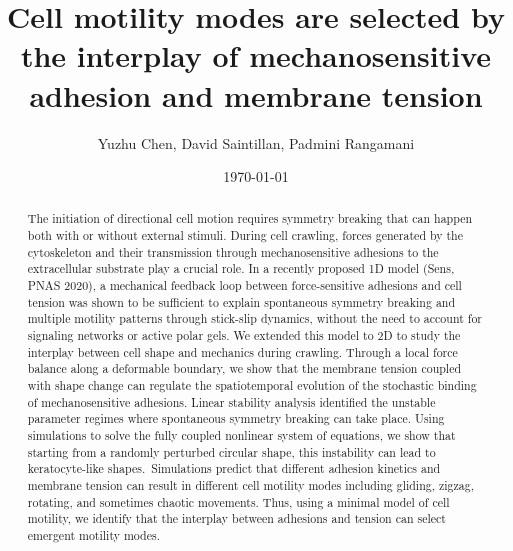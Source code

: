 \documentclass[12pt]{article}
\title{Cell motility modes are selected by the interplay of mechanosensitive adhesion and membrane tension}
\author{Yuzhu Chen, David Saintillan, Padmini Rangamani}
\date{\today}
\begin{document}
\maketitle

\begin{abstract}
    The initiation of directional cell motion requires symmetry breaking that can happen both with or without external stimuli. 
    During cell crawling, forces generated by the cytoskeleton and their transmission through mechanosensitive adhesions to the extracellular substrate play a crucial role. 
    In a recently proposed 1D model (Sens, PNAS 2020), a mechanical feedback loop between force-sensitive adhesions and cell tension was shown to be sufficient to explain spontaneous symmetry breaking and multiple motility patterns through stick-slip dynamics, without the need to account for signaling networks or active polar gels. 
    We extended this model to 2D to study the interplay between cell shape and mechanics during crawling. 
    Through a local force balance along a deformable boundary, we show that the membrane tension coupled with shape change can regulate the spatiotemporal evolution of the stochastic binding of mechanosensitive adhesions. 
    Linear stability analysis identified the unstable parameter regimes where spontaneous symmetry breaking can take place. 
    Using simulations to solve the fully coupled nonlinear system of equations, we show that starting from a randomly perturbed circular shape, this instability can lead to keratocyte-like shapes.\ 
    Simulations predict that different adhesion kinetics and membrane tension can result in different cell motility modes including gliding, zigzag, rotating, and sometimes chaotic movements. 
    Thus, using a minimal model of cell motility, we identify that the interplay between adhesions and tension can select emergent motility modes.
\end{abstract}
\end{document}

